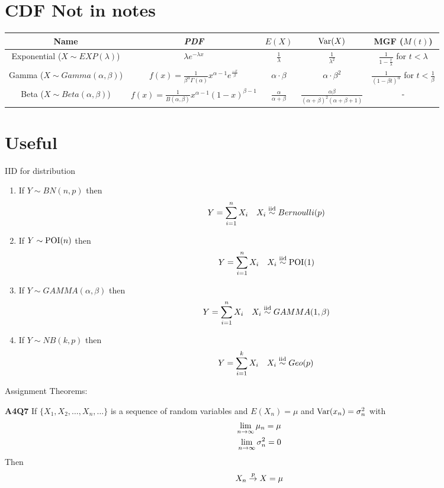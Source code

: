 \documentclass[16pt,a4paper]{article}
\begin{document}
\section*{CDF Not in notes}
\begin{tabular}{|c|c|c|c|c|}
\hline 
Name & \textit{PDF} & $E(X)$ & $\mathrm{Var}(X)$ & MGF ($M(t)$) \\ 
\hline 
Exponential ($X\sim EXP(\lambda)$) & $\lambda e^{-\lambda x}$ & $\frac{1}{\lambda}$ & $\frac{1}{\lambda^2}$ & $\frac{1}{1-\frac{t}{\lambda}}$ for $t<\lambda$ \\ 
\hline 
Gamma ($X\sim Gamma(\alpha, \beta)$) & $f(x) = \frac{1}{\beta^\alpha \Gamma(\alpha)}x^{\alpha -1}e^{\frac{-x}{\beta}}$ & $\alpha\cdot \beta$ & $\alpha \cdot \beta^2$ & $\frac{1}{(1-\beta t)^\alpha}$ for $t<\frac{1}{\beta}$ \\ 
\hline 
Beta ($X\sim Beta(\alpha, \beta)$) & $f(x) = \frac{1}{B(\alpha, \beta)}x^{\alpha -1}(1-x)^{\beta -1}$ & $\frac{\alpha}{\alpha+\beta}$ & $\frac{\alpha\beta}{(\alpha+\beta)^2(\alpha+\beta+1)}$ & - \\ 
\hline 
\end{tabular} 
\newpage
\section*{Useful}
IID for distribution
\begin{enumerate}[\# 1]
\item If $Y \sim BN(n,p)$ then 
\begin{align*}
Y = \sum_{i=1}^n X_i && X_i \overset{\mathrm{iid}}{\sim} Bernoulli(p)
\end{align*}

\item
If $Y \sim \mathrm{POI}(n)$ then 
\begin{align*}
Y = \sum_{i=1}^n X_i  && X_i \overset{\mathrm{iid}}{\sim} \mathrm{POI}(1)
\end{align*}


\item If $Y \sim GAMMA(\alpha, \beta)$ then 
\begin{align*}
Y = \sum_{i=1}^n X_i && X_i \overset{\mathrm{iid}}{\sim} GAMMA(1, \beta)
\end{align*}

\item If $Y \sim NB(k,p)$ then 
\begin{align*}
Y = \sum_{i=1}^k X_i && X_i \overset{\mathrm{iid}}{\sim} Geo(p)
\end{align*}
\end{enumerate}

Assignment Theorems: 
\begin{thm}{\textbf{A4Q7}}
If $\{X_1, X_2, \ldots, X_n, \ldots\}$ is a sequence of random variables and $E(X_n) = \mu$ and $\mathrm{Var}(x_n) = \sigma_n^2$ with 
\begin{align*}
\lim\limits_{n \rightarrow \infty} \mu_n = \mu\\
\lim\limits_{n \rightarrow \infty} \sigma_n^2 = 0\\
\end{align*}
Then
\begin{align*}
X_n \overset{p}{\to} X = \mu
\end{align*}
\end{thm}
\end{document}
